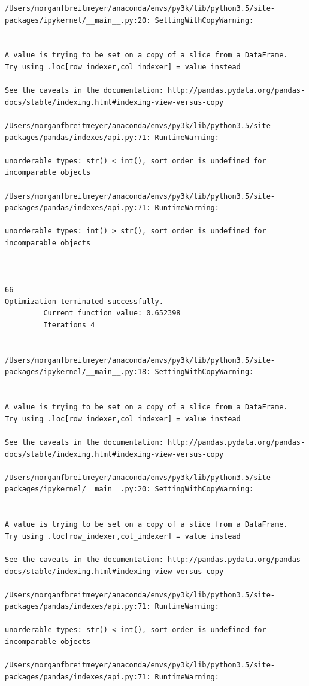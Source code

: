 \begin{lstlisting}
/Users/morganfbreitmeyer/anaconda/envs/py3k/lib/python3.5/site-packages/ipykernel/__main__.py:20: SettingWithCopyWarning:


A value is trying to be set on a copy of a slice from a DataFrame.
Try using .loc[row_indexer,col_indexer] = value instead

See the caveats in the documentation: http://pandas.pydata.org/pandas-docs/stable/indexing.html#indexing-view-versus-copy

/Users/morganfbreitmeyer/anaconda/envs/py3k/lib/python3.5/site-packages/pandas/indexes/api.py:71: RuntimeWarning:

unorderable types: str() < int(), sort order is undefined for incomparable objects

/Users/morganfbreitmeyer/anaconda/envs/py3k/lib/python3.5/site-packages/pandas/indexes/api.py:71: RuntimeWarning:

unorderable types: int() > str(), sort order is undefined for incomparable objects



66
Optimization terminated successfully.
         Current function value: 0.652398
         Iterations 4


/Users/morganfbreitmeyer/anaconda/envs/py3k/lib/python3.5/site-packages/ipykernel/__main__.py:18: SettingWithCopyWarning:


A value is trying to be set on a copy of a slice from a DataFrame.
Try using .loc[row_indexer,col_indexer] = value instead

See the caveats in the documentation: http://pandas.pydata.org/pandas-docs/stable/indexing.html#indexing-view-versus-copy

/Users/morganfbreitmeyer/anaconda/envs/py3k/lib/python3.5/site-packages/ipykernel/__main__.py:20: SettingWithCopyWarning:


A value is trying to be set on a copy of a slice from a DataFrame.
Try using .loc[row_indexer,col_indexer] = value instead

See the caveats in the documentation: http://pandas.pydata.org/pandas-docs/stable/indexing.html#indexing-view-versus-copy

/Users/morganfbreitmeyer/anaconda/envs/py3k/lib/python3.5/site-packages/pandas/indexes/api.py:71: RuntimeWarning:

unorderable types: str() < int(), sort order is undefined for incomparable objects

/Users/morganfbreitmeyer/anaconda/envs/py3k/lib/python3.5/site-packages/pandas/indexes/api.py:71: RuntimeWarning:


\end{lstlisting}
